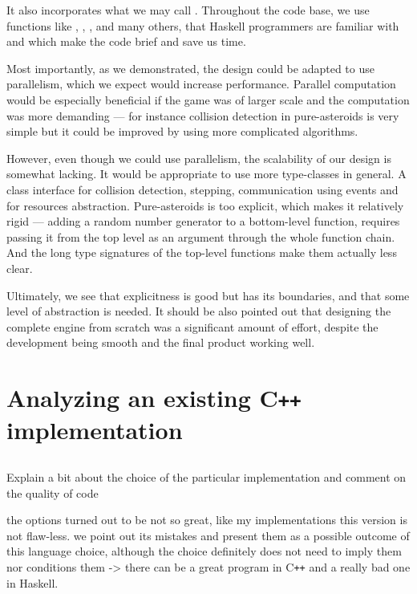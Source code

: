 \documentclass[
  digital, %
  color,   %
  table,   %
  oneside, %
  lof,     %
  lot,     %
]{fithesis3}
\newcommand{\cpp}{C\nolinebreak\texttt{+}\nolinebreak\texttt{+}}
\begin{document}
{It also incorporates what we may call .
Throughout the code base, we use functions like , ,
,  and many others, that Haskell programmers are familiar
with and which make the code brief and save us time.

Most importantly, as we demonstrated, the design could be adapted to
use parallelism, which we expect would increase performance.
Parallel computation would be especially beneficial if the game was of larger scale
and the computation was more demanding --- for instance collision detection
in pure-asteroids is very simple but it could be improved by using more
complicated algorithms.

However, even though we could use parallelism, the scalability of our design is somewhat lacking.
It would be appropriate to use more type-classes in general. A class interface for
collision detection, stepping, communication using events and for resources abstraction.
Pure-asteroids is too explicit, which makes it relatively rigid
--- adding a random number
generator to a bottom-level function, requires passing it from the top level
as an argument through the whole function chain. And the long type signatures of the
top-level functions make them actually less clear.

Ultimately, we see that explicitness is good but has its boundaries,
and that some level of abstraction is needed. 
It should be also pointed out that designing the complete engine from scratch
was a significant amount of effort, despite the development being smooth and the final
product working well.





\chapter{Analyzing an existing \cpp{} implementation}
\label{chptr:impasteroids}

\section{}
Explain a bit about the choice of the particular implementation and
comment on the quality of code

the options turned out to be not so great, like my implementations
this version is not flaw-less. we point out its mistakes and present
them as a possible outcome of this language choice, although the choice
definitely does not need to imply them nor conditions them
-> there can be a great program in \cpp{} and a really bad one in Haskell.

}
\end{document}
